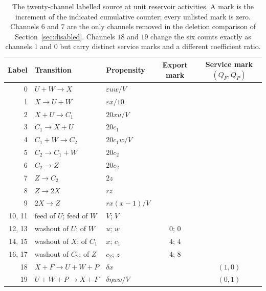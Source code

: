 \documentclass[11pt,a4paper]{article}
\theoremstyle{plain}
\theoremstyle{definition}
\theoremstyle{remark}
\newcommand{\eps}{\varepsilon}
\begin{document}
\begin{table}[t]
\centering\small
\caption{The twenty-channel labelled source at unit reservoir activities. A mark is the increment of the indicated cumulative counter; every unlisted mark is zero. Channels $6$ and $7$ are the only channels removed in the deletion comparison of Section~\ref{sec:disabled}. Channels $18$ and $19$ change the six counts exactly as channels $1$ and $0$ but carry distinct service marks and a different coefficient ratio.}\label{tab:source}
\begin{tabular}{rllcc}
\toprule Label & Transition & Propensity & Export mark & Service mark $(Q_F,Q_P)$\\\midrule
0 & $U+W\to X$ & $\eps uw/V$ & & \\
1 & $X\to U+W$ & $\eps x/10$ & & \\
2 & $X+U\to C_1$ & $20xu/V$ & & \\
3 & $C_1\to X+U$ & $20c_1$ & & \\
4 & $C_1+W\to C_2$ & $20c_1w/V$ & & \\
5 & $C_2\to C_1+W$ & $20c_2$ & & \\
6 & $C_2\to Z$ & $20c_2$ & & \\
7 & $Z\to C_2$ & $2z$ & & \\
8 & $Z\to 2X$ & $rz$ & & \\
9 & $2X\to Z$ & $rx(x-1)/V$ & & \\
10, 11 & feed of $U$; feed of $W$ & $V$; $V$ & & \\
12, 13 & washout of $U$; of $W$ & $u$; $w$ & $0$; $0$ & \\
14, 15 & washout of $X$; of $C_1$ & $x$; $c_1$ & $4$; $4$ & \\
16, 17 & washout of $C_2$; of $Z$ & $c_2$; $z$ & $4$; $8$ & \\
18 & $X+F\to U+W+P$ & $\delta x$ & & $(1,0)$\\
19 & $U+W+P\to X+F$ & $\delta\eta uw/V$ & & $(0,1)$\\\bottomrule
\end{tabular}
\end{table}
\end{document}
